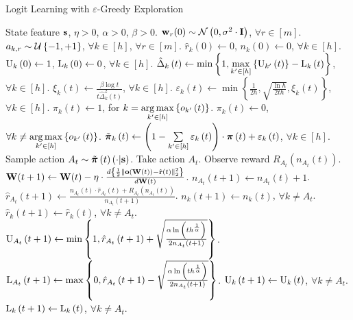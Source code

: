 \begin{algorithm}[t]
	\caption{Logit Learning with $\varepsilon$-Greedy Exploration}
	\label{alg:logit_learning_eps_greedy_exploration}
	\begin{algorithmic}
		 State feature ${\mathbf{s}}$, $\eta > 0$, $\alpha > 0$, $\beta > 0$.
		\STATE ${\mathbf{w}}_r(0) \sim {\mathcal{N}}\left( 0, \sigma^2 \cdot {\mathbf{I}} \right)$, $\forall r \in [m]$.
		\STATE $a_{k, r} \sim {\mathcal{U}}\left\{-1, +1\right\}$, $\forall k \in [h]$, $\forall r \in [m]$.
		\STATE $\hat{r}_{k}\left(0\right) \gets 0$, $n_{k}\left(0\right) \gets 0$, $\forall k \in [h]$.
		\STATE ${\text{U}}_k\left(0\right) \gets 1$, ${\text{L}}_k\left(0\right) \gets 0$, $\forall k \in [h]$.
		\STATE $\hat{\Delta}_{k}\left(t\right) \gets \min\left\{ 1,  \max\limits_{k^\prime \in \left[h\right]}\left\{ {\text{U}}_{k^\prime}\left(t\right) \right\}  - {\text{L}}_{k}\left(t\right)\right\} $, $\forall k \in [h]$.
		\STATE $\xi_k\left(t\right) \gets \frac{\beta \log{t}}{t \hat{\Delta}_k^2\left(t\right)}$, $\forall k \in [h]$.
		\STATE $\varepsilon_k\left(t\right) \gets \min\left\{ \frac{1}{2 h}, \sqrt{\frac{\ln{h}}{2 t h}},  \xi_k\left(t\right) \right\}$, $\forall k \in [h]$.
		\STATE $\pi_{k}\left(t\right) \gets 1$, for $k = \operatorname*{arg\,max}\limits_{k^\prime \in \left[h\right]}\left\{ o_{ k^\prime}\left(t\right)\right\}$.
		\STATE $\pi_{k}\left(t\right) \gets 0$, $\forall k \not= \operatorname*{arg\,max}\limits_{k^\prime \in \left[h\right]}\left\{ o_{ k^\prime}\left(t\right)\right\}$.
		\STATE $\tilde{{\boldsymbol{\pi}}}_k\left(t\right) \gets \left( 1 - \sum\limits_{k^\prime \in [h]}{\varepsilon_k\left(t\right)} \right) \cdot  {\boldsymbol{\pi}}\left(t\right) + \varepsilon_k\left(t\right)$, $\forall k \in [h]$.
		\STATE Sample action $A_{t} \sim \tilde{{\boldsymbol{\pi}}}\left(t\right)\left(\cdot \middle| {\mathbf{s}} \right)$.
		\STATE Take action $A_{t}$. Observe reward $R_{ A_{t}}\left(n_{ A_{t}}\left(t\right) \right)$.
		\STATE ${\mathbf{W}}(t+1) \leftarrow {\mathbf{W}}(t) - \eta \cdot \frac{d \left\{ \frac{1}{2} \left\| {\mathbf{o}}\left( {\mathbf{W}}\left(t\right)\right) - \hat{{\mathbf{r}}}\left(t\right) \right\|_2^2 \right\}}{d {\mathbf{W}}(t)}$.
		\STATE $n_{A_{t}}\left(t+1\right) \gets n_{ A_{t}}\left(t\right) + 1$.
		\STATE $\hat{r}_{A_{t}}\left(t+1\right) \gets \frac{n_{ A_{t}}\left(t\right) \cdot \hat{r}_{A_{t}}\left(t\right) + R_{A_{t}}\left(n_{A_{t}}\left(t\right)\right) }{n_{ A_{t}}\left(t+1\right)}$.
		\STATE $n_{k}\left(t+1\right) \gets n_{ k}\left(t\right)$, $\forall k \not= A_t$.
		\STATE $\hat{r}_{k}\left(t+1\right) \gets \hat{r}_{k}\left(t\right)$, $\forall k \not= A_t$.
		\STATE ${\text{U}}_{A_t}\left(t+1\right) \gets \min{\left\{ 1, \hat{r}_{A_{t}}\left(t+1\right) + \sqrt{\frac{\alpha \ln{\left( t h^{\frac{1}{\alpha}}\right)}}{2 n_{A_t}\left(t+1\right)}}\right\}}$.
		\STATE ${\text{L}}_{A_t}\left(t+1\right) \gets \max{\left\{ 0, \hat{r}_{A_{t}}\left(t+1\right) - \sqrt{\frac{\alpha \ln{\left( t h^{\frac{1}{\alpha}}\right)}}{2 n_{A_t}\left(t+1\right)}}\right\}}$.
		\STATE ${\text{U}}_{k}\left(t+1\right) \gets {\text{U}}_{k}\left(t\right)$, $\forall k \not= A_t$.
		\STATE ${\text{L}}_{k}\left(t+1\right) \gets {\text{L}}_{k}\left(t\right)$, $\forall k \not= A_t$.
		\ENDFOR
	\end{algorithmic}
\end{algorithm}